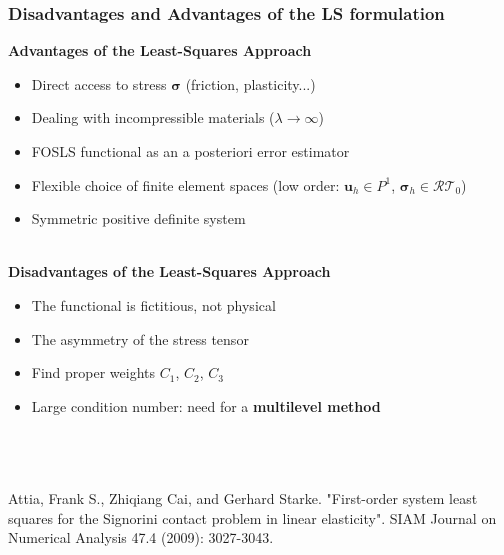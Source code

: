 \documentclass[8pt, oneside]{beamer}   	%
\newcommand{\bu}{\textbf{u}}
\newcommand{\bsigma}{\boldsymbol{\sigma}}
\newcommand{\RT}{\mathcal{RT}}
\newcommand{\titlecolor}[1]{\frametitle{\textcolor{dkgrey}{ \textbf{#1}}}}
\begin{document}


\begin{frame}
\titlecolor{Disadvantages and Advantages of the LS formulation}
 \textbf{Advantages of the Least-Squares Approach}
\begin{itemize} 
\item Direct access to stress $\bsigma$ (friction, plasticity...)
\item Dealing with incompressible materials ($\lambda \to \infty$)
\item FOSLS functional as an a posteriori error estimator
\item Flexible choice of finite element spaces (low order: $\bu_h \in P^1$, $\bsigma_h \in \RT_0$)
\item Symmetric positive definite system
\end{itemize}
${}$\\
 \textbf{Disadvantages of the Least-Squares Approach}
\begin{itemize} 
\item The functional is fictitious, not physical
\item The asymmetry of the stress tensor
\item Find proper weights $C_1$, $C_2$, $C_3$
\item Large condition number: need for a \textbf{multilevel method}
\end{itemize}
${}$\\
${}$\\
${}$\\
\tiny{Attia, Frank S., Zhiqiang Cai, and Gerhard Starke. "First-order system least squares for the Signorini contact problem in linear elasticity". SIAM Journal on Numerical Analysis 47.4 (2009): 3027-3043.}\\
\end{frame}
\end{document}
